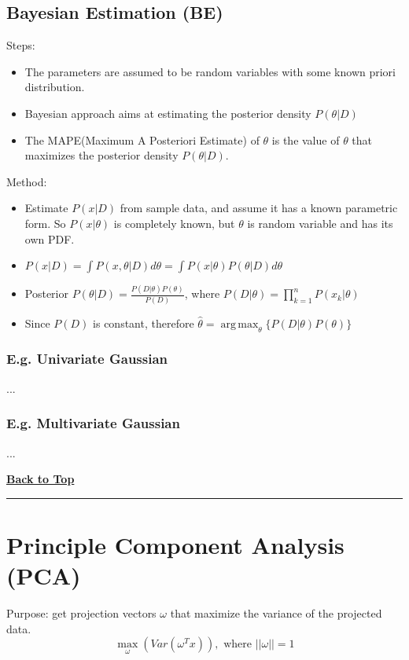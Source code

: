 \documentclass[letterpaper,10pt]{article}
\DeclareMathOperator*{\argmax}{arg\,max}
\newcommand{\pandochline}{\vspace{2em}\href{./document.html}{\textbf{Back to Top}}
	\vspace{-2em}\begin{center}\rule{\textwidth}{1pt}\end{center}}
\begin{document}
\subsection{Bayesian Estimation (BE)}
Steps:
\begin{itemize}
	\item The parameters are assumed to be random variables with some known priori distribution.
	\item Bayesian approach aims at estimating the posterior density $P(\theta|D)$
	\item The MAPE(Maximum A Posteriori Estimate) of $\theta$ is the value of $\theta$ that maximizes the posterior density $P(\theta|D)$.
\end{itemize}
Method:
\begin{itemize}
	\item Estimate $P(x|D)$ from sample data, and assume it has a known parametric form. So $P(x|\theta)$ is completely known, but $\theta$ is random variable and has its own PDF.
	\item $P(x|D)=\int{P(x,\theta|D)d\theta}=\int{P(x|\theta)P(\theta|D)d\theta}$
	\item Posterior $P(\theta|D)=\frac{P(D|\theta)P(\theta)}{P(D)}$, where $P(D|\theta)=\prod_{k=1}^{n}{P(x_k|\theta)}$
	\item Since $P(D)$ is constant, therefore $\hat{\theta}=\argmax_\theta\{P(D|\theta)P(\theta)\}$
\end{itemize}

\subsubsection{E.g. Univariate Gaussian}
...

\subsubsection{E.g. Multivariate Gaussian}
...

\pandochline
\section{Principle Component Analysis (PCA)}
Purpose: get projection vectors $\omega$ that maximize the variance of the projected data.
\begin{equation}
\max_\omega(Var(\omega^Tx)),\text{~where~}||\omega||=1
\end{equation}
\end{document}
